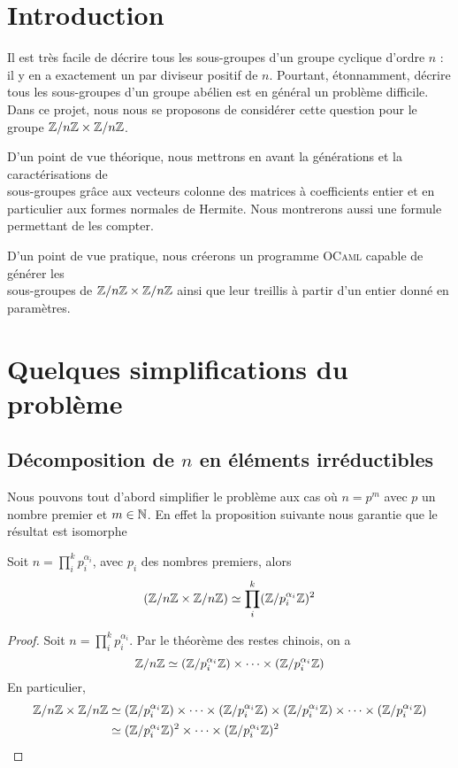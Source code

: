 \documentclass[11pt]{article}
\begin{document}

\tableofcontents
\newpage

\section{Introduction}
Il est très facile de décrire tous les sous-groupes d'un groupe cyclique
d'ordre $n$ : il y en a exactement un par diviseur positif de $n$.
Pourtant, étonnamment, décrire tous les sous-groupes d'un groupe abélien
est en général un problème difficile.\\
Dans ce projet, nous nous se proposons de considérer cette question pour le groupe $\mathbb Z/n\mathbb Z \times \mathbb Z/n\mathbb Z$.

D'un point de vue théorique, nous mettrons en avant la générations et la caractérisations de \\
sous-groupes grâce aux vecteurs colonne des matrices à coefficients entier et en particulier aux formes
normales de Hermite. Nous montrerons aussi une formule permettant de les compter.

D'un point de vue pratique, nous créerons un programme \textsc{OCaml} capable de générer les\\
sous-groupes de $\mathbb Z/n\mathbb Z \times \mathbb Z/n\mathbb Z$ ainsi que leur treillis à partir d'un entier donné en paramètres.
\section{Quelques simplifications du problème}
\subsection{Décomposition de $n$ en éléments irréductibles}

Nous pouvons tout d'abord simplifier le problème aux cas où $n = p^m$ avec $p$ un nombre premier
et $m \in \mathbb N$. En effet la proposition suivante nous garantie que le résultat est isomorphe
\begin{proposition}
	Soit $n = \prod\limits_i^k p_i^{\alpha_i}$, avec $p_i$ des nombres premiers, alors
	$$(\mathbb Z/n\mathbb Z \times \mathbb Z/n\mathbb Z) \simeq \prod_i^k(\mathbb Z/p_i^{\alpha_i}\mathbb Z)^2$$
\end{proposition}

\begin{proof}
	Soit $n = \prod\limits_i^k p_i^{\alpha_i}$. Par le théorème des restes chinois, on a
	$$ \mathbb Z/n\mathbb Z \simeq (\mathbb Z/p_i^{\alpha_i}\mathbb Z) \times \cdots \times (\mathbb Z/p_i^{\alpha_i}\mathbb Z)$$
	En particulier,
	\begin{equation*}
		\begin{split}
			\mathbb Z/n\mathbb Z \times \mathbb Z/n\mathbb Z & \simeq
			(\mathbb Z/p_i^{\alpha_i}\mathbb Z) \times \cdots \times (\mathbb Z/p_i^{\alpha_i}\mathbb Z) \times (\mathbb Z/p_i^{\alpha_i}\mathbb Z) \times \cdots \times (\mathbb Z/p_i^{\alpha_i}\mathbb Z)\\
			& \simeq (\mathbb Z/p_i^{\alpha_i}\mathbb Z)^2 \times \cdots \times (\mathbb Z/p_i^{\alpha_i}\mathbb Z)^2
		\end{split}
	\end{equation*}
\end{proof}
\end{document}
